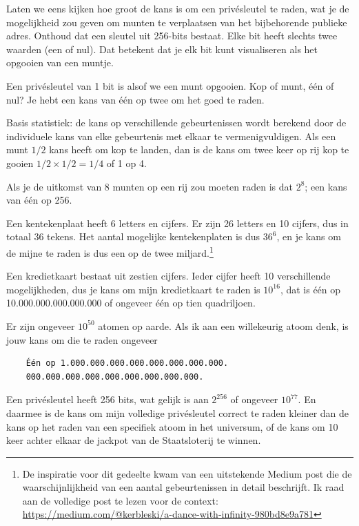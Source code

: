 \documentclass[
  letterpaper,
]{scrbook}
\begin{document}
Laten we eens kijken hoe groot de kans is om een privésleutel te raden,
wat je de mogelijkheid zou geven om munten te verplaatsen van het
bijbehorende publieke adres. Onthoud dat een sleutel uit 256-bits
bestaat. Elke bit heeft slechts twee waarden (een of nul). Dat betekent
dat je elk bit kunt visualiseren als het opgooien van een muntje.

Een privésleutel van 1 bit is alsof we een munt opgooien. Kop of munt,
één of nul? Je hebt een kans van één op twee om het goed te raden.

Basis statistiek: de kans op verschillende gebeurtenissen wordt berekend
door de individuele kans van elke gebeurtenis met elkaar te
vermenigvuldigen. Als een munt \(1/2\) kans heeft om kop te landen, dan
is de kans om twee keer op rij kop te gooien \(1/2 \times 1/2 = 1/4\) of
1 op 4.

Als je de uitkomst van 8 munten op een rij zou moeten raden is dat
\(2^{8}\); een kans van één op 256.

Een kentekenplaat heeft 6 letters en cijfers. Er zijn 26 letters en 10
cijfers, dus in totaal 36 tekens. Het aantal mogelijke kentekenplaten is
dus \(36^{6}\), en je kans om de mijne te raden is dus een op de twee
miljard.\footnote{De inspiratie voor dit gedeelte kwam van een
  uitstekende Medium post die de waarschijnlijkheid van een aantal
  gebeurtenissen in detail beschrijft. Ik raad aan de volledige post te
  lezen voor de context:
  \url{https://medium.com/@kerbleski/a-dance-with-infinity-980bd8e9a781}}

Een kredietkaart bestaat uit zestien cijfers. Ieder cijfer heeft 10
verschillende mogelijkheden, dus je kans om mijn kredietkaart te raden
is \(10^{16}\), dat is één op 10.000.000.000.000.000 of ongeveer één op
tien quadriljoen.

Er zijn ongeveer \(10^{50}\) atomen op aarde. Als ik aan een willekeurig
atoom denk, is jouw kans om die te raden ongeveer

\begin{verbatim}
    Één op 1.000.000.000.000.000.000.000.000.
    000.000.000.000.000.000.000.000.000.
\end{verbatim}

Een privésleutel heeft 256 bits, wat gelijk is aan \(2^{256}\) of
ongeveer \(10^{77}\). En daarmee is de kans om mijn volledige
privésleutel correct te raden kleiner dan de kans op het raden van een
specifiek atoom in het universum, of de kans om 10 keer achter elkaar de
jackpot van de Staatsloterij te winnen.
\end{document}
